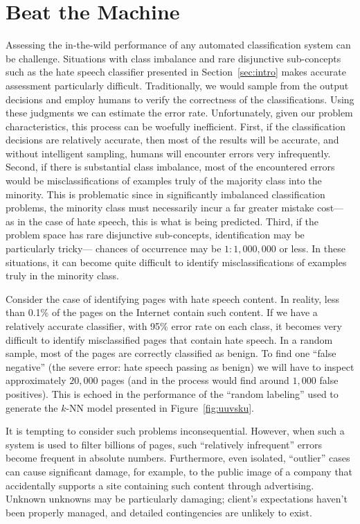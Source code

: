 \section{Beat the Machine}
\label{sec:btm}
Assessing the in-the-wild performance of any automated classification system can be challenge. Situations with class imbalance and rare disjunctive sub-concepts such as the hate speech classifier presented in Section~\ref{sec:intro} makes accurate assessment particularly difficult. Traditionally, we would sample from the output decisions and employ humans to verify the correctness of the classifications.  Using these judgments we can estimate the error rate. Unfortunately, given our problem characteristics, this process can be woefully inefficient. First, if the classification decisions are relatively accurate, then most of the results will be accurate, and without intelligent sampling, humans will encounter errors very infrequently. Second, if there is substantial class imbalance, most of the encountered errors would be misclassifications of examples truly of the majority class into the minority. This is problematic since in significantly imbalanced classification problems, the minority class must necessarily incur a far greater mistake cost--- as in the case of hate speech, this is what is being predicted. Third, if the problem space has rare disjunctive sub-concepts, identification may be particularly tricky--- chances of occurrence may be $1:1,000,000$ or less. In these situations, it can become quite difficult to identify misclassifications of examples truly in the minority class. 

\begin{xmpl} Consider the case of identifying pages with hate speech content. In   reality, less than 0.1\% of the pages on the Internet contain such content. If we   have a relatively accurate classifier, with 95\% error rate on each class, it becomes very difficult to identify misclassified pages that contain hate speech. In a random sample, most of the pages are correctly classified as benign. To find one ``false negative'' (the severe error: hate speech passing as benign) we will have to inspect approximately $20,000$ pages (and in the process would find around $1,000$ false positives). This is echoed in the   performance of the ``random labeling'' used to generate the $k$-NN model presented in Figure~\ref{fig:uuvsku}. \end{xmpl} 

It is tempting to consider such problems inconsequential. However, when such a system is used to filter billions of pages, such ``relatively infrequent'' errors become frequent in absolute numbers. Furthermore, even isolated, ``outlier'' cases can cause significant damage, for example, to the public image of a company that accidentally supports a site containing such content through advertising. Unknown unknowns may be particularly damaging; client's expectations haven't been properly managed, and detailed contingencies are unlikely to exist. 

